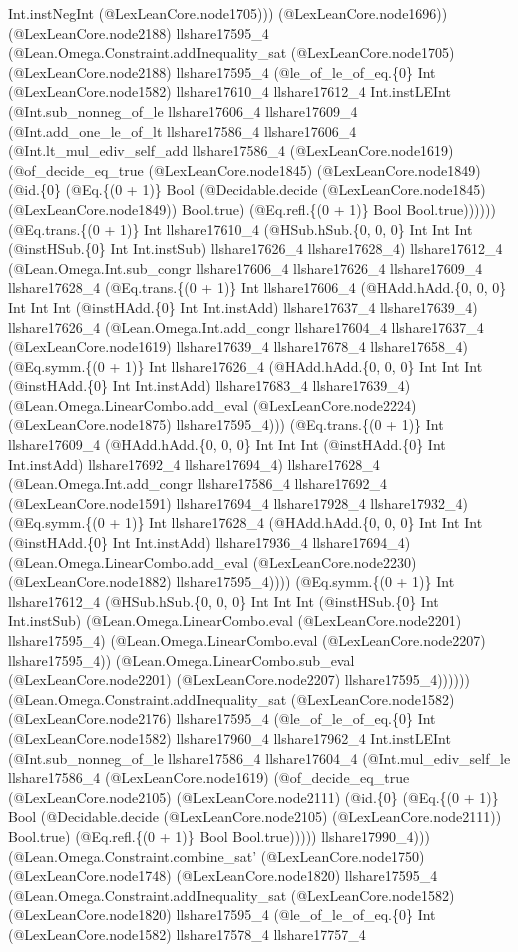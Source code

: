 \documentclass[11pt]{article}
\begin{document}
Int.instNegInt (@LexLeanCore.node1705))) (@LexLeanCore.node1696)) (@LexLeanCore.node2188) llshare17595\_4 (@Lean.Omega.Constraint.addInequality\_sat (@LexLeanCore.node1705) (@LexLeanCore.node2188) llshare17595\_4 (@le\_of\_le\_of\_eq.\{0\} Int (@LexLeanCore.node1582) llshare17610\_4 llshare17612\_4 Int.instLEInt (@Int.sub\_nonneg\_of\_le llshare17606\_4 llshare17609\_4 (@Int.add\_one\_le\_of\_lt llshare17586\_4 llshare17606\_4 (@Int.lt\_mul\_ediv\_self\_add llshare17586\_4 (@LexLeanCore.node1619) (@of\_decide\_eq\_true (@LexLeanCore.node1845) (@LexLeanCore.node1849) (@id.\{0\} (@Eq.\{(0 + 1)\} Bool (@Decidable.decide (@LexLeanCore.node1845) (@LexLeanCore.node1849)) Bool.true) (@Eq.refl.\{(0 + 1)\} Bool Bool.true)))))) (@Eq.trans.\{(0 + 1)\} Int llshare17610\_4 (@HSub.hSub.\{0, 0, 0\} Int Int Int (@instHSub.\{0\} Int Int.instSub) llshare17626\_4 llshare17628\_4) llshare17612\_4 (@Lean.Omega.Int.sub\_congr llshare17606\_4 llshare17626\_4 llshare17609\_4 llshare17628\_4 (@Eq.trans.\{(0 + 1)\} Int llshare17606\_4 (@HAdd.hAdd.\{0, 0, 0\} Int Int Int (@instHAdd.\{0\} Int Int.instAdd) llshare17637\_4 llshare17639\_4) llshare17626\_4 (@Lean.Omega.Int.add\_congr llshare17604\_4 llshare17637\_4 (@LexLeanCore.node1619) llshare17639\_4 llshare17678\_4 llshare17658\_4) (@Eq.symm.\{(0 + 1)\} Int llshare17626\_4 (@HAdd.hAdd.\{0, 0, 0\} Int Int Int (@instHAdd.\{0\} Int Int.instAdd) llshare17683\_4 llshare17639\_4) (@Lean.Omega.LinearCombo.add\_eval (@LexLeanCore.node2224) (@LexLeanCore.node1875) llshare17595\_4))) (@Eq.trans.\{(0 + 1)\} Int llshare17609\_4 (@HAdd.hAdd.\{0, 0, 0\} Int Int Int (@instHAdd.\{0\} Int Int.instAdd) llshare17692\_4 llshare17694\_4) llshare17628\_4 (@Lean.Omega.Int.add\_congr llshare17586\_4 llshare17692\_4 (@LexLeanCore.node1591) llshare17694\_4 llshare17928\_4 llshare17932\_4) (@Eq.symm.\{(0 + 1)\} Int llshare17628\_4 (@HAdd.hAdd.\{0, 0, 0\} Int Int Int (@instHAdd.\{0\} Int Int.instAdd) llshare17936\_4 llshare17694\_4) (@Lean.Omega.LinearCombo.add\_eval (@LexLeanCore.node2230) (@LexLeanCore.node1882) llshare17595\_4)))) (@Eq.symm.\{(0 + 1)\} Int llshare17612\_4 (@HSub.hSub.\{0, 0, 0\} Int Int Int (@instHSub.\{0\} Int Int.instSub) (@Lean.Omega.LinearCombo.eval (@LexLeanCore.node2201) llshare17595\_4) (@Lean.Omega.LinearCombo.eval (@LexLeanCore.node2207) llshare17595\_4)) (@Lean.Omega.LinearCombo.sub\_eval (@LexLeanCore.node2201) (@LexLeanCore.node2207) llshare17595\_4)))))) (@Lean.Omega.Constraint.addInequality\_sat (@LexLeanCore.node1582) (@LexLeanCore.node2176) llshare17595\_4 (@le\_of\_le\_of\_eq.\{0\} Int (@LexLeanCore.node1582) llshare17960\_4 llshare17962\_4 Int.instLEInt (@Int.sub\_nonneg\_of\_le llshare17586\_4 llshare17604\_4 (@Int.mul\_ediv\_self\_le llshare17586\_4 (@LexLeanCore.node1619) (@of\_decide\_eq\_true (@LexLeanCore.node2105) (@LexLeanCore.node2111) (@id.\{0\} (@Eq.\{(0 + 1)\} Bool (@Decidable.decide (@LexLeanCore.node2105) (@LexLeanCore.node2111)) Bool.true) (@Eq.refl.\{(0 + 1)\} Bool Bool.true))))) llshare17990\_4))) (@Lean.Omega.Constraint.combine\_sat' (@LexLeanCore.node1750) (@LexLeanCore.node1748) (@LexLeanCore.node1820) llshare17595\_4 (@Lean.Omega.Constraint.addInequality\_sat (@LexLeanCore.node1582) (@LexLeanCore.node1820) llshare17595\_4 (@le\_of\_le\_of\_eq.\{0\} Int (@LexLeanCore.node1582) llshare17578\_4 llshare17757\_4 
\end{document}
